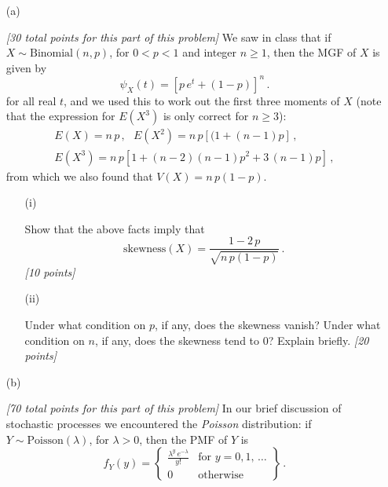 \documentclass[12pt]{article}
\begin{document}
\begin{itemize}

\item[(a)]

\textit{[30 total points for this part of this problem]} We saw in class that if $X \sim \text{Binomial} ( n, p )$, for $0 < p < 1$ and integer $n \ge 1$, then the MGF of $X$ is given by
\begin{equation} \label{e:binomial-mgf-1}
\psi_X ( t ) = \left[ p \, e^t + ( 1 - p ) \right]^n \, .
\end{equation}
for all real $t$, and we used this to work out the first three moments of $X$ (note that the expression for $E \left( X^3 \right)$ is only correct for $n \ge 3$):
\begin{eqnarray} \label{e:binomial-mgf-2}
E ( X ) = n \, p \, , \ \ \ E \left( X^2 \right) = n \, p [ ( 1 + ( n - 1 ) p ] \, , \\ E \left( X^3 \right) = n \, p [ 1 + ( n - 2 ) ( n - 1 ) p^2 + 3 \, ( n - 1 ) p ] \, ,
\end{eqnarray}
from which we also found that $V ( X ) = n \, p ( 1 - p )$. 

\begin{itemize}

\item[(i)]

Show that the above facts imply that
\begin{equation} \label{e:binomial-mgf-3}
\mbox{skewness} ( X ) = \frac{ 1 - 2 \, p }{ \sqrt{ n \, p ( 1 - p ) } } \, .
\end{equation}
\textit{[10 points]}

\item[(ii)]

Under what condition on $p$, if any, does the skewness vanish? Under what condition on $n$, if any, does the skewness tend to 0? Explain briefly. \textit{[20 points]}

\end{itemize}

\item[(b)]

\textit{[70 total points for this part of this problem]} In our brief discussion of stochastic processes we encountered the \textit{Poisson} distribution: if $Y \sim \text{Poisson} ( \lambda )$, for $\lambda > 0$, then the PMF of $Y$ is
\begin{equation} \label{e:poisson-mgf-1}
f_Y ( y ) = \left\{ \begin{array}{cc} \frac{ \lambda^y \, e^{ - \lambda } }{ y ! } & \text{for } y = 0, 1, \, \dots \\ 0 & \text{otherwise} \end{array} \right\} \, .
\end{equation}


\end{itemize}
\end{document}
